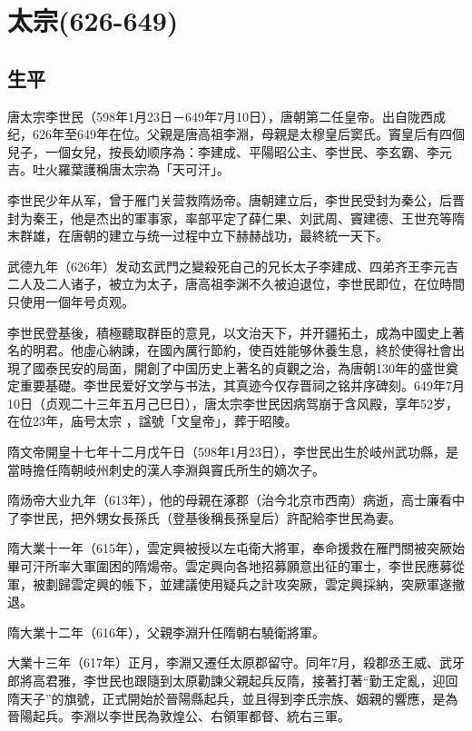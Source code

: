 
\section{太宗\tiny(626-649)}

\subsection{生平}

唐太宗李世民（598年1月23日－649年7月10日），唐朝第二任皇帝。出自陇西成纪，626年至649年在位。父親是唐高祖李淵，母親是太穆皇后窦氏。竇皇后有四個兒子，一個女兒，按長幼顺序為：李建成、平陽昭公主、李世民、李玄霸、李元吉。吐火羅葉護稱唐太宗為「天可汗」。

李世民少年从军，曾于雁门关营救隋炀帝。唐朝建立后，李世民受封为秦公，后晋封为秦王，他是杰出的軍事家，率部平定了薛仁果、刘武周、竇建德、王世充等隋末群雄，在唐朝的建立与统一过程中立下赫赫战功，最終統一天下。

武德九年（626年）发动玄武門之變殺死自己的兄长太子李建成、四弟齐王李元吉二人及二人诸子，被立为太子，唐高祖李渊不久被迫退位，李世民即位，在位時間只使用一個年号贞观。

李世民登基後，積極聽取群臣的意見，以文治天下，并开疆拓土，成為中國史上著名的明君。他虛心納諫，在國內厲行節約，使百姓能够休養生息，終於使得社會出現了國泰民安的局面，開創了中国历史上著名的貞觀之治，為唐朝130年的盛世奠定重要基礎。李世民爱好文学与书法，其真迹今仅存晋祠之铭并序碑刻。649年7月10日（贞观二十三年五月己巳日），唐太宗李世民因病驾崩于含风殿，享年52岁，在位23年，庙号太宗 ，諡號「文皇帝」，葬于昭陵。

隋文帝開皇十七年十二月戊午日（598年1月23日），李世民出生於岐州武功縣，是當時擔任隋朝岐州刺史的漢人李淵與竇氏所生的嫡次子。

隋炀帝大业九年（613年），他的母親在涿郡（治今北京市西南）病逝，高士廉看中了李世民，把外甥女長孫氏（登基後稱長孫皇后）許配給李世民為妻。

隋大業十一年（615年），雲定興被授以左屯衛大將軍，奉命援救在雁門關被突厥始畢可汗所率大軍圍困的隋煬帝。雲定興向各地招募願意出征的軍士，李世民應募從軍，被劃歸雲定興的帳下，並建議使用疑兵之計攻突厥，雲定興採納，突厥軍遂撤退。

隋大業十二年（616年），父親李淵升任隋朝右驍衛將軍。

大業十三年（617年）正月，李淵又遷任太原郡留守。同年7月，殺郡丞王威、武牙郎將高君雅，李世民也跟隨到太原勸諫父親起兵反隋，接著打著“勤王定亂，迎回隋天子”的旗號，正式開始於晉陽縣起兵，並且得到李氏宗族、姻親的響應，是為晉陽起兵。李淵以李世民為敦煌公、右領軍都督、統右三軍。

